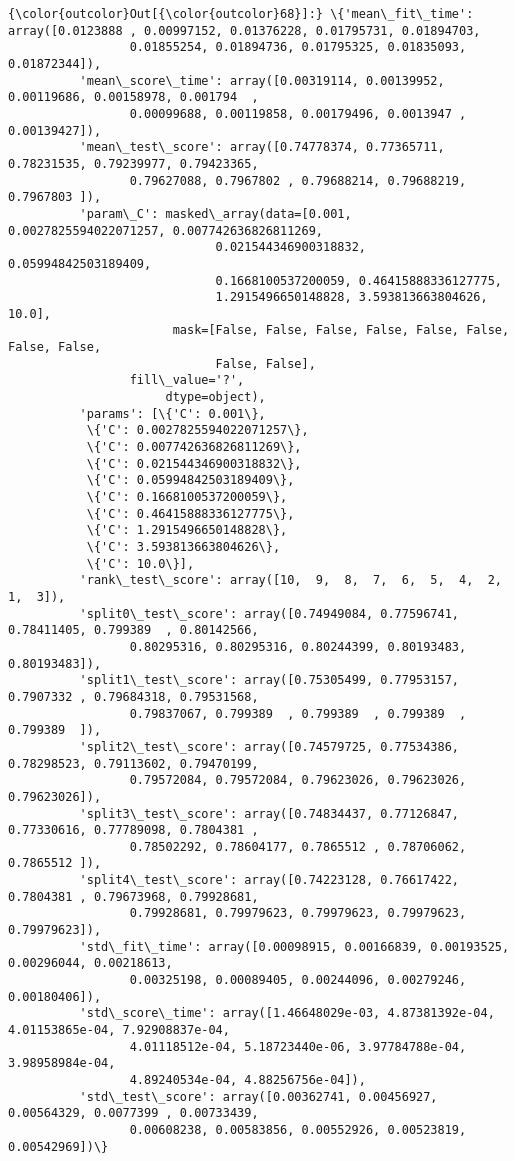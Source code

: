 \documentclass[11pt]{article}
\begin{document}
\begin{Verbatim}[commandchars=\\\{\}]
{\color{outcolor}Out[{\color{outcolor}68}]:} \{'mean\_fit\_time': array([0.0123888 , 0.00997152, 0.01376228, 0.01795731, 0.01894703,
                 0.01855254, 0.01894736, 0.01795325, 0.01835093, 0.01872344]),
          'mean\_score\_time': array([0.00319114, 0.00139952, 0.00119686, 0.00158978, 0.001794  ,
                 0.00099688, 0.00119858, 0.00179496, 0.0013947 , 0.00139427]),
          'mean\_test\_score': array([0.74778374, 0.77365711, 0.78231535, 0.79239977, 0.79423365,
                 0.79627088, 0.7967802 , 0.79688214, 0.79688219, 0.7967803 ]),
          'param\_C': masked\_array(data=[0.001, 0.0027825594022071257, 0.007742636826811269,
                             0.021544346900318832, 0.05994842503189409,
                             0.1668100537200059, 0.46415888336127775,
                             1.2915496650148828, 3.593813663804626, 10.0],
                       mask=[False, False, False, False, False, False, False, False,
                             False, False],
                 fill\_value='?',
                      dtype=object),
          'params': [\{'C': 0.001\},
           \{'C': 0.0027825594022071257\},
           \{'C': 0.007742636826811269\},
           \{'C': 0.021544346900318832\},
           \{'C': 0.05994842503189409\},
           \{'C': 0.1668100537200059\},
           \{'C': 0.46415888336127775\},
           \{'C': 1.2915496650148828\},
           \{'C': 3.593813663804626\},
           \{'C': 10.0\}],
          'rank\_test\_score': array([10,  9,  8,  7,  6,  5,  4,  2,  1,  3]),
          'split0\_test\_score': array([0.74949084, 0.77596741, 0.78411405, 0.799389  , 0.80142566,
                 0.80295316, 0.80295316, 0.80244399, 0.80193483, 0.80193483]),
          'split1\_test\_score': array([0.75305499, 0.77953157, 0.7907332 , 0.79684318, 0.79531568,
                 0.79837067, 0.799389  , 0.799389  , 0.799389  , 0.799389  ]),
          'split2\_test\_score': array([0.74579725, 0.77534386, 0.78298523, 0.79113602, 0.79470199,
                 0.79572084, 0.79572084, 0.79623026, 0.79623026, 0.79623026]),
          'split3\_test\_score': array([0.74834437, 0.77126847, 0.77330616, 0.77789098, 0.7804381 ,
                 0.78502292, 0.78604177, 0.7865512 , 0.78706062, 0.7865512 ]),
          'split4\_test\_score': array([0.74223128, 0.76617422, 0.7804381 , 0.79673968, 0.79928681,
                 0.79928681, 0.79979623, 0.79979623, 0.79979623, 0.79979623]),
          'std\_fit\_time': array([0.00098915, 0.00166839, 0.00193525, 0.00296044, 0.00218613,
                 0.00325198, 0.00089405, 0.00244096, 0.00279246, 0.00180406]),
          'std\_score\_time': array([1.46648029e-03, 4.87381392e-04, 4.01153865e-04, 7.92908837e-04,
                 4.01118512e-04, 5.18723440e-06, 3.97784788e-04, 3.98958984e-04,
                 4.89240534e-04, 4.88256756e-04]),
          'std\_test\_score': array([0.00362741, 0.00456927, 0.00564329, 0.0077399 , 0.00733439,
                 0.00608238, 0.00583856, 0.00552926, 0.00523819, 0.00542969])\}
\end{Verbatim}
            
\end{document}
